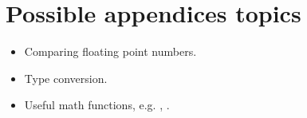 \section*{Possible appendices topics}

\begin{itemize}

	\item Comparing floating point numbers.
	\item Type conversion.
	\item Useful math functions, e.g. , .

\end{itemize}